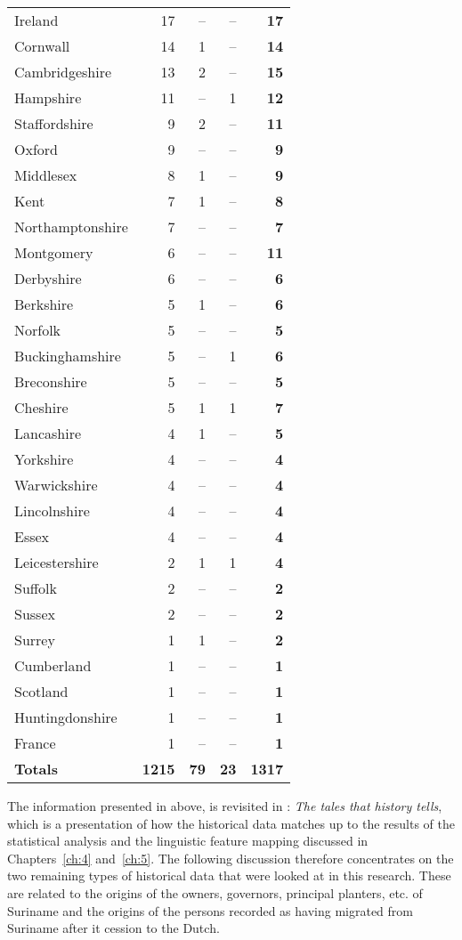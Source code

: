 \begin{longtable}{lrrrr}
Ireland & 17 & -- & -- & \textbf{17}\\
Cornwall & 14 & 1 & -- & \textbf{14}\\
Cambridgeshire & 13 & 2 & -- & \textbf{15}\\
Hampshire & 11 & -- & 1 &\textbf{12}\\
Staffordshire & 9 & 2 & -- & \textbf{11}\\
Oxford & 9 & -- & -- & \textbf{9}\\
Middlesex & 8 & 1 & -- & \textbf{9}\\
Kent & 7 & 1 & -- & \textbf{8}\\
Northamptonshire & 7 & -- & -- & \textbf{7}\\
Montgomery & 6 & -- & -- & \textbf{11}\\
Derbyshire & 6 & -- & -- & \textbf{6}\\
Berkshire & 5 & 1 & -- & \textbf{6}\\
Norfolk & 5 & -- & -- & \textbf{5}\\
Buckinghamshire & 5 & -- & 1 & \textbf{6}\\
Breconshire & 5 & -- & -- & \textbf{5}\\
Cheshire & 5 & 1 & 1 & \textbf{7}\\
Lancashire & 4 & 1 & -- & \textbf{5}\\
Yorkshire & 4 & -- & -- & \textbf{4}\\
Warwickshire & 4 & -- & -- & \textbf{4}\\
Lincolnshire & 4 & -- & -- & \textbf{4}\\
Essex & 4 & -- & -- & \textbf{4}\\
Leicestershire & 2 & 1 & 1 & \textbf{4}\\
Suffolk & 2 & -- & -- & \textbf{2}\\
Sussex & 2 & -- & -- & \textbf{2}\\
Surrey &1 & 1 & -- & \textbf{2}\\
Cumberland & 1 & -- & -- & \textbf{1}\\
Scotland & 1 & -- & -- & \textbf{1}\\
Huntingdonshire & 1 & -- & -- & \textbf{1}\\
France & 1 & -- & -- & \textbf{1}\\
\textbf{Totals} & \textbf{1215} & \textbf{79} & \textbf{23} & \textbf{1317}
\label{Table 6.3}
\end{longtable}

The information presented in  above, is revisited in : \emph{The tales that history tells}, which is a presentation of how the historical data matches up to the results of the statistical analysis and the linguistic feature mapping discussed in Chapters~\ref{ch:4} and~\ref{ch:5}. The following discussion therefore concentrates on the two remaining types of historical data that were looked at in this research. These are related to the origins of the owners, governors, principal planters, etc. of Suriname and the origins of the persons recorded as having migrated from Suriname after it cession to the Dutch.

